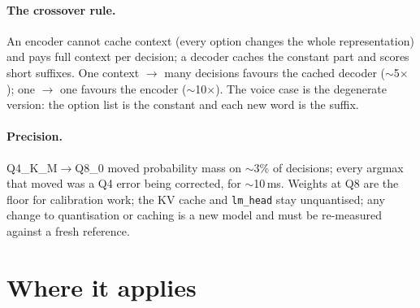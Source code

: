 \documentclass[11pt,a4paper]{article}
\newcommand{\code}[1]{\texttt{#1}}
\begin{document}
\paragraph{The crossover rule.} An encoder cannot cache context (every option changes the whole representation) and pays full context per decision; a decoder caches the constant part and scores short suffixes. One context $\to$ many decisions favours the cached decoder ($\sim$5$\times$); one $\to$ one favours the encoder ($\sim$10$\times$). The voice case is the degenerate version: the option list is the constant and each new word is the suffix.

\paragraph{Precision.} Q4\_K\_M$\to$Q8\_0 moved probability mass on $\sim$3\% of decisions; every argmax that moved was a Q4 error being corrected, for $\sim$10\,ms. Weights at Q8 are the floor for calibration work; the KV cache and \code{lm\_head} stay unquantised; any change to quantisation or caching is a new model and must be re-measured against a fresh reference.

\section{Where it applies}
\label{sec:apps}
\end{document}
